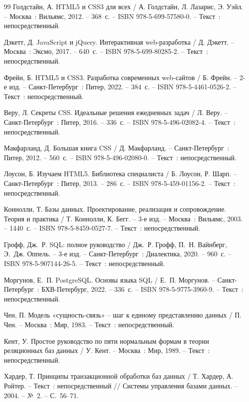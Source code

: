\begin{thebibliography}{99}
	Голдстайн, А. HTML5 и CSS3 для всех / А. Голдстайн, Л. Лазарис, Э. Уэйл. – Москва~: Вильямс, 2012. – 368~с. – ISBN 978-5-699-57580-0. – Текст~: непосредственный.
	
	Дэкетт, Д. JavaScript и jQuery. Интерактивная web-разработка / Д. Дэкетт. – Москва~: Эксмо, 2017. – 640~с. – ISBN 978-5-699-80285-2. – Текст~: непосредственный.
	
	Фрейн, Б. HTML5 и CSS3. Разработка современных web-сайтов / Б. Фрейн. – 2-е изд. – Санкт-Петербург~: Питер, 2022. – 384~с. – ISBN 978-5-4461-0526-2. – Текст~: непосредственный.
	
	Веру, Л. Секреты CSS. Идеальные решения ежедневных задач / Л. Веру. – Санкт-Петербург~: Питер, 2016. – 336~с. – ISBN 978-5-496-02082-4. – Текст~: непосредственный.
	
	Макфарланд, Д. Большая книга CSS / Д. Макфарланд. – Санкт-Петербург~: Питер, 2012. – 560~с. – ISBN 978-5-496-02080-0. – Текст~: непосредственный.
	
	Лоусон, Б. Изучаем HTML5. Библиотека специалиста / Б. Лоусон, Р. Шарп. – Санкт-Петербург~: Питер, 2013. – 286~с. – ISBN 978-5-459-01156-2. – Текст~: непосредственный.
	
	Коннолли, Т. Базы данных. Проектирование, реализация и сопровождение. Теория и практика / Т. Коннолли, К. Бегг. – 3-е изд. – Москва~: Вильямс, 2003. – 1440~с. – ISBN 978-5-8459-0527-7. – Текст~: непосредственный.
	
	Грофф, Дж.~Р. SQL: полное руководство / Дж.~Р. Грофф, П.~Н. Вайнберг, Э.~Дж. Оппель. – 3-е изд. – Санкт-Петербург~: Диалектика, 2020. – 960~с. – ISBN 978-5-907144-26-5. – Текст~: непосредственный.
	
	Моргунов, Е.~П. PostgreSQL. Основы языка SQL / Е.~П. Моргунов. – Санкт-Петербург~: БХВ-Петербург, 2022. – 336~с. – ISBN 978-5-9775-3960-9. – Текст~: непосредственный.
	
	Чен, П. Модель «сущность-связь» – шаг к единому представлению данных / П. Чен. – Москва~: Мир, 1983. – Текст~: непосредственный.
	
	Кент, У. Простое руководство по пяти нормальным формам в теории реляционных баз данных / У. Кент. – Москва~: Мир, 1989. – Текст~: непосредственный.
	
	Хардер, Т. Принципы транзакционной обработки баз данных / Т. Хардер, А. Ройтер. – Текст~: непосредственный // Системы управления базами данных. – 2004. – №~2. – С.~56--71.
	

\end{thebibliography}
